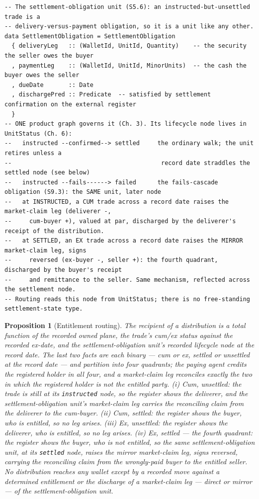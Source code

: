 \documentclass[11pt,a4paper]{article}
\newtheorem{proposition}[definition]{Proposition}
\begin{document}
\begin{lstlisting}
-- The settlement-obligation unit (S5.6): an instructed-but-unsettled trade is a
-- delivery-versus-payment obligation, so it is a unit like any other.
data SettlementObligation = SettlementObligation
  { deliveryLeg   :: (WalletId, UnitId, Quantity)    -- the security the seller owes the buyer
  , paymentLeg    :: (WalletId, UnitId, MinorUnits)  -- the cash the buyer owes the seller
  , dueDate       :: Date
  , dischargePred :: Predicate  -- satisfied by settlement confirmation on the external register
  }
-- ONE product graph governs it (Ch. 3). Its lifecycle node lives in UnitStatus (Ch. 6):
--   instructed --confirmed--> settled     the ordinary walk; the unit retires unless a
--                                          record date straddles the settled node (see below)
--   instructed --fails------> failed      the fails-cascade obligation (S9.3): the SAME unit, later node
--   at INSTRUCTED, a CUM trade across a record date raises the market-claim leg (deliverer -,
--     cum-buyer +), valued at par, discharged by the deliverer's receipt of the distribution.
--   at SETTLED, an EX trade across a record date raises the MIRROR market-claim leg, signs
--     reversed (ex-buyer -, seller +): the fourth quadrant, discharged by the buyer's receipt
--     and remittance to the seller. Same mechanism, reflected across the settlement node.
-- Routing reads this node from UnitStatus; there is no free-standing settlement-state type.
\end{lstlisting}

\begin{proposition}[Entitlement routing]
The recipient of a distribution is a total function of the recorded owned plane, the
trade's cum/ex status against the recorded ex-date, and the settlement-obligation unit's
recorded lifecycle node at the record date. The last two facts are each binary --- cum or
ex, settled or unsettled at the record date --- and partition into four quadrants; the
paying agent credits the registered holder in all four, and a market-claim leg reconciles
exactly the two in which the registered holder is not the entitled party.
\emph{(i) Cum, unsettled:} the trade is still at its \texttt{instructed} node, so the
register shows the deliverer, and the settlement-obligation unit's market-claim leg
carries the reconciling claim from the deliverer to the cum-buyer.
\emph{(ii) Cum, settled:} the register shows the buyer, who is entitled, so no leg arises.
\emph{(iii) Ex, unsettled:} the register shows the deliverer, who is entitled, so no leg
arises.
\emph{(iv) Ex, settled --- the fourth quadrant:} the register shows the buyer, who is
\emph{not} entitled, so the same settlement-obligation unit, at its \texttt{settled} node,
raises the \emph{mirror} market-claim leg, signs reversed, carrying the reconciling claim
from the wrongly-paid buyer to the entitled seller.
No distribution reaches any wallet except by a recorded move against a determined
entitlement or the discharge of a market-claim leg --- direct or mirror --- of the
settlement-obligation unit.
\end{proposition}
\end{document}
